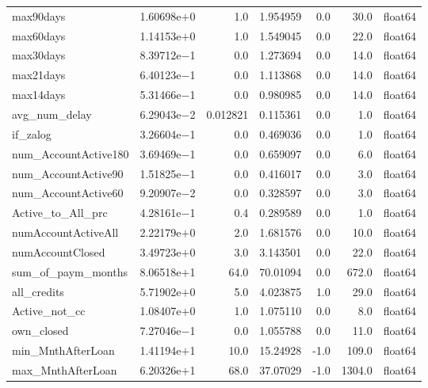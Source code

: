 \documentclass[12pt,a4paper]{article}
\begin{document}
\begin{longtable}{l|rrrrr|l}
    max90days                & 1.60698e$+$0 & 1.0      & 1.954959 & 0.0     & 30.0    & float64 \\
    max60days                & 1.14153e$+$0 & 1.0      & 1.549045 & 0.0     & 22.0    & float64 \\
    max30days                & 8.39712e$-$1 & 0.0      & 1.273694 & 0.0     & 14.0    & float64 \\
    max21days                & 6.40123e$-$1 & 0.0      & 1.113868 & 0.0     & 14.0    & float64 \\
    max14days                & 5.31466e$-$1 & 0.0      & 0.980985 & 0.0     & 14.0    & float64 \\
    avg\_num\_delay          & 6.29043e$-$2 & 0.012821 & 0.115361 & 0.0     & 1.0     & float64 \\
    if\_zalog                & 3.26604e$-$1 & 0.0      & 0.469036 & 0.0     & 1.0     & float64 \\
    num\_AccountActive180    & 3.69469e$-$1 & 0.0      & 0.659097 & 0.0     & 6.0     & float64 \\
    num\_AccountActive90     & 1.51825e$-$1 & 0.0      & 0.416017 & 0.0     & 3.0     & float64 \\
    num\_AccountActive60     & 9.20907e$-$2 & 0.0      & 0.328597 & 0.0     & 3.0     & float64 \\
    Active\_to\_All\_prc     & 4.28161e$-$1 & 0.4      & 0.289589 & 0.0     & 1.0     & float64 \\
    numAccountActiveAll      & 2.22179e$+$0 & 2.0      & 1.681576 & 0.0     & 10.0    & float64 \\
    numAccountClosed         & 3.49723e$+$0 & 3.0      & 3.143501 & 0.0     & 22.0    & float64 \\
    sum\_of\_paym\_months    & 8.06518e$+$1 & 64.0     & 70.01094 & 0.0     & 672.0   & float64 \\
    all\_credits             & 5.71902e$+$0 & 5.0      & 4.023875 & 1.0     & 29.0    & float64 \\
    Active\_not\_cc          & 1.08407e$+$0 & 1.0      & 1.075110 & 0.0     & 8.0     & float64 \\
    own\_closed              & 7.27046e$-$1 & 0.0      & 1.055788 & 0.0     & 11.0    & float64 \\
    min\_MnthAfterLoan       & 1.41194e$+$1 & 10.0     & 15.24928 & -1.0    & 109.0   & float64 \\
    max\_MnthAfterLoan       & 6.20326e$+$1 & 68.0     & 37.07029 & -1.0    & 1304.0  & float64 \\

\end{longtable}
\end{document}
